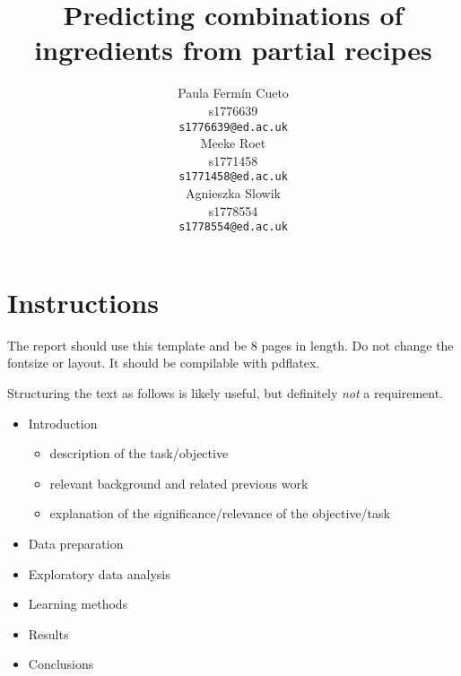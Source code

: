 \documentclass{article}
\title{Predicting combinations of ingredients from partial recipes}
\author{
  Paula Ferm\'in Cueto\\
  s1776639\\
  \texttt{s1776639@ed.ac.uk} \\
  \And
  Meeke Roet\\
  s1771458\\
  \texttt{s1771458@ed.ac.uk} \\
 \And
  Agnieszka Slowik\\
  s1778554\\
  \texttt{s1778554@ed.ac.uk} \\
}
\begin{document}
\maketitle

\begin{abstract}
 \blindtext[1]
\end{abstract}

\section{Instructions}

The report should use this template and be 8 pages in length. Do not change the fontsize or layout. It should be compilable with pdflatex.

Structuring the text as follows is likely useful, but definitely
\emph{not} a requirement.

\begin{itemize}
\item Introduction
  \begin{itemize}
  \item description of the task/objective
  \item relevant background and related previous work
  \item explanation of the significance/relevance of the objective/task
  \end{itemize}
\item Data preparation
\item Exploratory data analysis
\item Learning methods
\item Results
\item Conclusions
\end{itemize}
\end{document}
